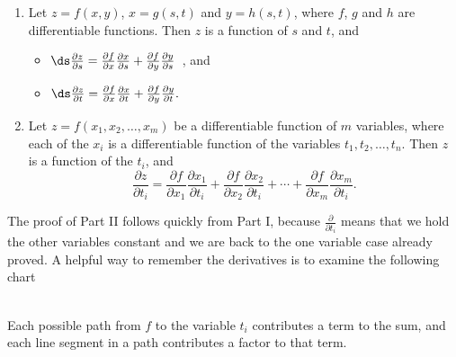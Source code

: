 {\begin{enumerate}
	\item Let $z=f(x,y)$, $x=g(s,t)$ and $y=h(s,t)$, where $f$, $g$ and $h$ are differentiable functions. Then $z$ is a function of $s$ and $t$, and
		\begin{itemize}
			\item $\ds \frac{\partial z}{\partial s} = \frac{\partial f}{\partial x}\frac{\partial x}{\partial s} + \frac{\partial f}{\partial y}\frac{\partial y}{\partial s}$\ , \quad and 
			\item $\ds \frac{\partial z}{\partial t} = \frac{\partial f}{\partial x}\frac{\partial x}{\partial t} + \frac{\partial f}{\partial y}\frac{\partial y}{\partial t}.$
		\end{itemize}
		
		\item		Let $z = f(x_1,x_2,\ldots,x_m)$ be a differentiable function of $m$ variables, where each of the $x_i$ is a differentiable function of the variables $t_1,t_2,\ldots,t_n$. Then $z$ is a function of the $t_i$, and 
		$$\frac{\partial z}{\partial t_i} = \frac{\partial f}{\partial x_1}\frac{\partial x_1}{\partial t_i} + \frac{\partial f}{\partial x_2}\frac{\partial x_2}{\partial t_i} + \cdots +  \frac{\partial f}{\partial x_m}\frac{\partial x_m}{\partial t_i}.$$
\end{enumerate}}

The proof of Part II follows quickly from Part I, because $\frac\partial{\partial t_i}$ means that we hold the other variables constant and we are back to the one variable case already proved.  A helpful way to remember the derivatives is to examine the following chart\\
\begin{lxfigure}\centering
{}
\end{lxfigure}\\
Each possible path from $f$ to the variable $t_i$ contributes a term to the sum, and each line segment in a path contributes a factor to that term.

